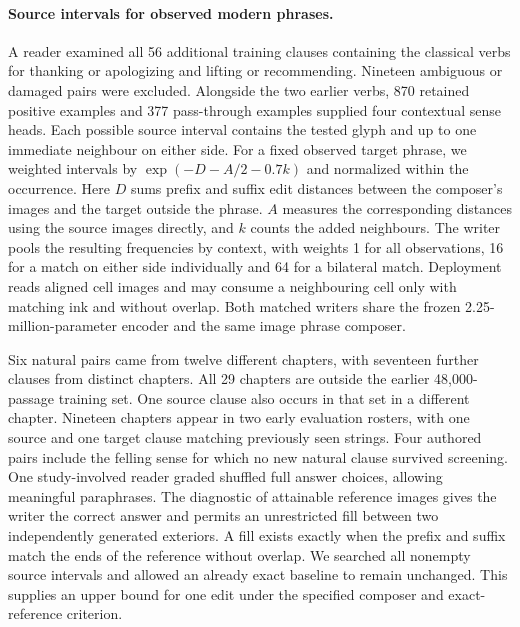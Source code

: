 \documentclass[12pt,a4paper]{article}
\providecommand{\DIFadd}[1]{{\protect\color{blue} \sf #1}} %
\begin{document}
\paragraph{\DIFadd{Source intervals for observed modern phrases.}}
\DIFadd{A reader examined all 56 additional training clauses containing the classical verbs for thanking or apologizing and lifting or recommending. Nineteen ambiguous or damaged pairs were excluded. Alongside the two earlier verbs, 870 retained positive examples and 377 pass-through examples supplied four contextual sense heads. Each possible source interval contains the tested glyph and up to one immediate neighbour on either side. For a fixed observed target phrase, we weighted intervals by $\exp(-D-A/2-0.7k)$ and normalized within the occurrence. Here $D$ sums prefix and suffix edit distances between the composer's images and the target outside the phrase. $A$ measures the corresponding distances using the source images directly, and $k$ counts the added neighbours. The writer pools the resulting frequencies by context, with weights 1 for all observations, 16 for a match on either side individually and 64 for a bilateral match. Deployment reads aligned cell images and may consume a neighbouring cell only with matching ink and without overlap. Both matched writers share the frozen 2.25-million-parameter encoder and the same image phrase composer.
}

\DIFadd{Six natural pairs came from twelve different chapters, with seventeen further clauses from distinct chapters. All 29 chapters are outside the earlier 48,000-passage training set. One source clause also occurs in that set in a different chapter. Nineteen chapters appear in two early evaluation rosters, with one source and one target clause matching previously seen strings. Four authored pairs include the felling sense for which no new natural clause survived screening. One study-involved reader graded shuffled full answer choices, allowing meaningful paraphrases. The diagnostic of attainable reference images gives the writer the correct answer and permits an unrestricted fill between two independently generated exteriors. A fill exists exactly when the prefix and suffix match the ends of the reference without overlap. We searched all nonempty source intervals and allowed an already exact baseline to remain unchanged. This supplies an upper bound for one edit under the specified composer and exact-reference criterion.
}
\end{document}
